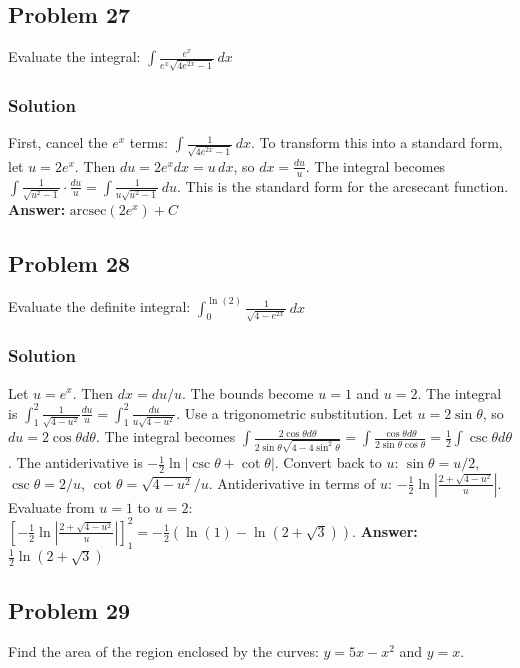 \documentclass{article}
\begin{document}
\subsection{Problem 27}
Evaluate the integral: $ \int \frac{e^x}{e^x \sqrt{4e^{2x} - 1}} \,dx $
\subsubsection*{Solution}
First, cancel the $e^x$ terms: $ \int \frac{1}{\sqrt{4e^{2x} - 1}} \,dx $.
To transform this into a standard form, let $u=2e^x$. Then $du = 2e^x dx = u \,dx$, so $dx = \frac{du}{u}$.
The integral becomes $ \int \frac{1}{\sqrt{u^2-1}} \cdot \frac{du}{u} = \int \frac{1}{u\sqrt{u^2-1}} \,du $.
This is the standard form for the arcsecant function.
\textbf{Answer:} $ \text{arcsec}(2e^x) + C $

\subsection{Problem 28}
Evaluate the definite integral: $ \int_{0}^{\ln(2)} \frac{1}{\sqrt{4 - e^{2x}}} \,dx $
\subsubsection*{Solution}
Let $u = e^x$. Then $dx = du/u$. The bounds become $u=1$ and $u=2$.
The integral is $ \int_{1}^{2} \frac{1}{\sqrt{4-u^2}} \frac{du}{u} = \int_{1}^{2} \frac{du}{u\sqrt{4-u^2}} $.
Use a trigonometric substitution. Let $u = 2\sin\theta$, so $du = 2\cos\theta d\theta$.
The integral becomes $ \int \frac{2\cos\theta d\theta}{2\sin\theta \sqrt{4-4\sin^2\theta}} = \int \frac{\cos\theta d\theta}{2\sin\theta\cos\theta} = \frac{1}{2}\int \csc\theta d\theta $.
The antiderivative is $ -\frac{1}{2}\ln|\csc\theta + \cot\theta| $.
Convert back to $u$: $\sin\theta = u/2$, $\csc\theta = 2/u$, $\cot\theta=\sqrt{4-u^2}/u$.
Antiderivative in terms of $u$: $ -\frac{1}{2}\ln\left|\frac{2+\sqrt{4-u^2}}{u}\right| $.
Evaluate from $u=1$ to $u=2$: $ \left[-\frac{1}{2}\ln\left|\frac{2+\sqrt{4-u^2}}{u}\right|\right]_1^2 = -\frac{1}{2}(\ln(1) - \ln(2+\sqrt{3})) $.
\textbf{Answer:} $ \frac{1}{2}\ln(2+\sqrt{3}) $

\subsection{Problem 29}
Find the area of the region enclosed by the curves: $y = 5x - x^2$ and $y = x$.
\end{document}
